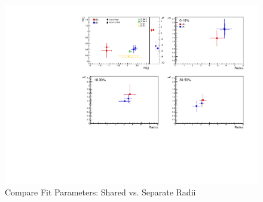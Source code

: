\documentclass[../AnalysisNoteJBuxton.tex]{subfiles}
\begin{document}
\begin{figure}[h]
  \centering
  \includegraphics[width=\textwidth]{7_ResultsAndDiscussion/Figures/CompareAllScattParams_CompSharedvsSepR_StatOnly.pdf}
  \caption[Compare Fit Parameters: Shared vs. Separate Radii]{Compare Fit Parameters: Shared vs. Separate Radii}
  \label{fig:CompareAllScattParams_SharevsSepR}
\end{figure}



\clearpage
\end{document}
